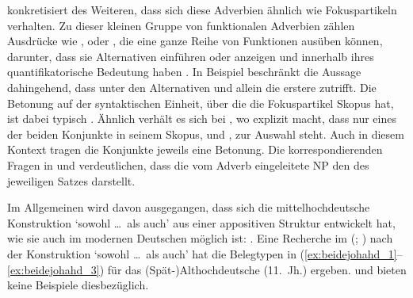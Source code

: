 \citet[425--428]{johannessen2005} konkretisiert des Weiteren, dass sich diese
Adverbien ähnlich wie Fokuspartikeln verhalten. Zu
dieser kleinen Gruppe von funktionalen Adverbien zählen Ausdrücke wie
,  oder , die eine ganze Reihe von Funktionen
ausüben können, darunter, dass sie Alternativen einführen oder anzeigen und
innerhalb ihres  quantifikatorische Bedeutung
haben \autocite[vgl.][1--4, 15]{koenig1991}. In Beispiel 
beschränkt  die Aussage dahingehend, dass unter den Alternativen
 und  allein die erstere zutrifft. Die Betonung auf der
syntaktischen Einheit, über die die Fokuspartikel Skopus hat, ist
dabei typisch \autocite[10--14]{koenig1991}. Ähnlich verhält es sich bei
, wo  explizit macht, dass nur eines der beiden
Konjunkte in seinem Skopus,  und , zur Auswahl steht. Auch in
diesem Kontext tragen die Konjunkte jeweils eine Betonung. Die
korrespondierenden Fragen in  und 
verdeutlichen, dass die vom Adverb eingeleitete NP den  des
jeweiligen Satzes darstellt.

\begin{exe}
\end{exe}

Im Allgemeinen wird davon ausgegangen, dass sich die
mittelhochdeutsche Konstruktion 
`sowohl \dots\ als auch' aus einer appositiven Struktur
entwickelt hat, wie sie auch im modernen Deutschen möglich
ist:  \autocite[vgl.][626--627 und die
dortigen Referenzen]{ksw2}. Eine Recherche im  (;
\nosh\cite{ddd}) nach der Konstruktion  `sowohl \dots\
als auch' \autocite[vgl.][49]{schuetzeichel2012} hat die Belegtypen in
(\ref{ex:beidejohahd_1}--\ref{ex:beidejohahd_3}) für das
(Spät-)Althochdeutsche (11.~Jh.) ergeben. \citet{braune2018}
und \citet{schrodt2004} bieten keine Beispiele dies\-bezüglich.

